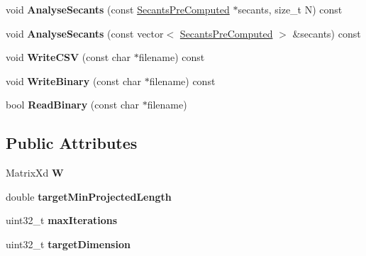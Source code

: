 \begin{DoxyCompactItemize}
\item 
\hypertarget{struct_d_r_d_s_p_1_1_proj_secant_a2bc2e242eb9dd71a6aec7c047870021a}{void {\bfseries Analyse\-Secants} (const \hyperlink{struct_d_r_d_s_p_1_1_secants_pre_computed}{Secants\-Pre\-Computed} $\ast$secants, size\-\_\-t N) const }\label{struct_d_r_d_s_p_1_1_proj_secant_a2bc2e242eb9dd71a6aec7c047870021a}

\item 
\hypertarget{struct_d_r_d_s_p_1_1_proj_secant_a60bc686a0b19aa9b281a4758ba21fd4d}{void {\bfseries Analyse\-Secants} (const vector$<$ \hyperlink{struct_d_r_d_s_p_1_1_secants_pre_computed}{Secants\-Pre\-Computed} $>$ \&secants) const }\label{struct_d_r_d_s_p_1_1_proj_secant_a60bc686a0b19aa9b281a4758ba21fd4d}

\item 
\hypertarget{struct_d_r_d_s_p_1_1_proj_secant_a0fc22577409b0117ab14f1b635eebc6d}{void {\bfseries Write\-C\-S\-V} (const char $\ast$filename) const }\label{struct_d_r_d_s_p_1_1_proj_secant_a0fc22577409b0117ab14f1b635eebc6d}

\item 
\hypertarget{struct_d_r_d_s_p_1_1_proj_secant_abcc803bd3d240249ea9a81f3e3afc9e5}{void {\bfseries Write\-Binary} (const char $\ast$filename) const }\label{struct_d_r_d_s_p_1_1_proj_secant_abcc803bd3d240249ea9a81f3e3afc9e5}

\item 
\hypertarget{struct_d_r_d_s_p_1_1_proj_secant_ae37dfe0f561f61c3ecfda5abc02e8b25}{bool {\bfseries Read\-Binary} (const char $\ast$filename)}\label{struct_d_r_d_s_p_1_1_proj_secant_ae37dfe0f561f61c3ecfda5abc02e8b25}

\end{DoxyCompactItemize}
\subsection*{Public Attributes}
\begin{DoxyCompactItemize}
\item 
\hypertarget{struct_d_r_d_s_p_1_1_proj_secant_a99ab0daf8cb539f9ecf07132d3994357}{Matrix\-Xd {\bfseries W}}\label{struct_d_r_d_s_p_1_1_proj_secant_a99ab0daf8cb539f9ecf07132d3994357}

\item 
\hypertarget{struct_d_r_d_s_p_1_1_proj_secant_a422dde54e49a8b5ab4f631fc0b8cf829}{double {\bfseries target\-Min\-Projected\-Length}}\label{struct_d_r_d_s_p_1_1_proj_secant_a422dde54e49a8b5ab4f631fc0b8cf829}

\item 
\hypertarget{struct_d_r_d_s_p_1_1_proj_secant_afa9954dc50be3af121c7590879782afa}{uint32\-\_\-t {\bfseries max\-Iterations}}\label{struct_d_r_d_s_p_1_1_proj_secant_afa9954dc50be3af121c7590879782afa}

\item 
\hypertarget{struct_d_r_d_s_p_1_1_proj_secant_aa74d47b541db9bf256f9602e2ae0646a}{uint32\-\_\-t {\bfseries target\-Dimension}}\label{struct_d_r_d_s_p_1_1_proj_secant_aa74d47b541db9bf256f9602e2ae0646a}

\end{DoxyCompactItemize}


